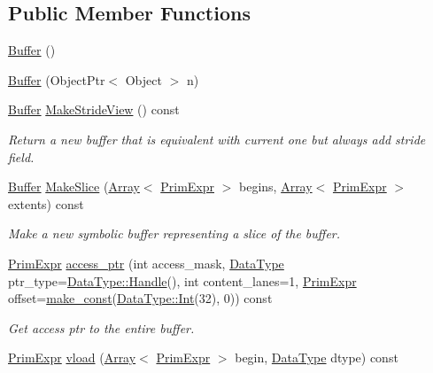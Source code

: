 \subsection*{Public Member Functions}
\begin{DoxyCompactItemize}
\item 
\hyperlink{classtvm_1_1tir_1_1Buffer_a0f8d32c4cedbf65f645c22ed9e33fa45}{Buffer} ()
\item 
\hyperlink{classtvm_1_1tir_1_1Buffer_ac033e5ebb29588c789152fb01dc99eff}{Buffer} (Object\+Ptr$<$ Object $>$ n)
\item 
\hyperlink{classtvm_1_1tir_1_1Buffer}{Buffer} \hyperlink{classtvm_1_1tir_1_1Buffer_a4e76e165819e6acfdd5929480774d8f7}{Make\+Stride\+View} () const 
\begin{DoxyCompactList}\small\item\em Return a new buffer that is equivalent with current one but always add stride field. \end{DoxyCompactList}\item 
\hyperlink{classtvm_1_1tir_1_1Buffer}{Buffer} \hyperlink{classtvm_1_1tir_1_1Buffer_a4ca636501d4d64d760b6762fa606f019}{Make\+Slice} (\hyperlink{classtvm_1_1Array}{Array}$<$ \hyperlink{classtvm_1_1PrimExpr}{Prim\+Expr} $>$ begins, \hyperlink{classtvm_1_1Array}{Array}$<$ \hyperlink{classtvm_1_1PrimExpr}{Prim\+Expr} $>$ extents) const 
\begin{DoxyCompactList}\small\item\em Make a new symbolic buffer representing a slice of the buffer. \end{DoxyCompactList}\item 
\hyperlink{classtvm_1_1PrimExpr}{Prim\+Expr} \hyperlink{classtvm_1_1tir_1_1Buffer_a746b074c21acb1782fa1079be5337128}{access\+\_\+ptr} (int access\+\_\+mask, \hyperlink{namespacetvm_a41918af1a1dc386388639a9d3ad06c5d}{Data\+Type} ptr\+\_\+type=\hyperlink{classtvm_1_1runtime_1_1DataType_aebad9f7235dd20af649fb5c2113797b8}{Data\+Type\+::\+Handle}(), int content\+\_\+lanes=1, \hyperlink{classtvm_1_1PrimExpr}{Prim\+Expr} offset=\hyperlink{namespacetvm_1_1tir_a4ea566597880d04bd62fbec687e338b5}{make\+\_\+const}(\hyperlink{classtvm_1_1runtime_1_1DataType_ab45f13dd70d982d9f977c79b6f7fac98}{Data\+Type\+::\+Int}(32), 0)) const 
\begin{DoxyCompactList}\small\item\em Get access ptr to the entire buffer. \end{DoxyCompactList}\item 
\hyperlink{classtvm_1_1PrimExpr}{Prim\+Expr} \hyperlink{classtvm_1_1tir_1_1Buffer_a0fb4f8f83e61b8c8a6c2d21331dcdd8f}{vload} (\hyperlink{classtvm_1_1Array}{Array}$<$ \hyperlink{classtvm_1_1PrimExpr}{Prim\+Expr} $>$ begin, \hyperlink{namespacetvm_a41918af1a1dc386388639a9d3ad06c5d}{Data\+Type} dtype) const 

\end{DoxyCompactItemize}
